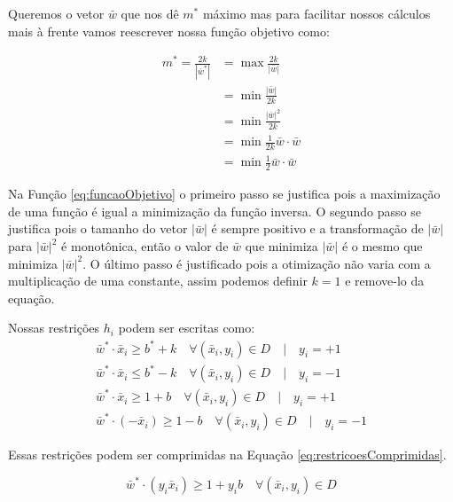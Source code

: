 Queremos o vetor $\bar{w}$ que nos dê $m^*$ máximo mas para facilitar nossos cálculos mais à frente vamos reescrever nossa função objetivo como:

\begin{equation}\label{eq:funcaoObjetivo}
\begin{split}
m^*=\frac{2k}{|\bar{w}^*|} &= \max \frac{2k}{|\bar{w}|} \\
    &= \min \frac{|\bar{w}|}{2k} \\
    &= \min \frac{|\bar{w}|^2}{2k}  \\
    &= \min \frac{1}{2k} \bar{w}\cdot\bar{w}  \\
    &= \min \frac{1}{2} \bar{w}\cdot\bar{w}
\end{split}
\end{equation}

Na Função \ref{eq:funcaoObjetivo} o primeiro passo se justifica pois a maximização de uma função é igual a minimização da função inversa. O segundo passo se justifica pois o tamanho do vetor $|\bar{w}|$ é sempre positivo e a transformação de $|\bar{w}|$ para $|\bar{w}|^2$ é monotônica, então o valor de $\bar{w}$ que minimiza $|\bar{w}|$ é o mesmo que minimiza $|\bar{w}|^2$. O último passo é justificado pois a otimização não varia com a multiplicação de uma constante, assim podemos definir $k=1$ e remove-lo da equação.

Nossas restrições $h_i$ podem ser escritas como:
\begin{equation}
\begin{split}
\bar{w}^*\cdot\bar{x}_i \ge b^*+k \quad \forall (\bar{x}_i,y_i)\in D \quad | \quad y_i=+1 \\
\bar{w}^*\cdot\bar{x}_i \le b^*-k \quad \forall (\bar{x}_i,y_i)\in D \quad | \quad y_i=-1 \\
\bar{w}^*\cdot\bar{x}_i \ge 1+b \quad \forall (\bar{x}_i,y_i)\in D \quad | \quad y_i=+1 \\
\bar{w}^*\cdot(-\bar{x}_i) \ge 1-b \quad \forall (\bar{x}_i,y_i)\in D \quad | \quad y_i=-1
\end{split}
\end{equation}

Essas restrições podem ser comprimidas na Equação \ref{eq:restricoesComprimidas}.

\begin{equation} \label{eq:restricoesComprimidas}
    \bar{w}^*\cdot(y_i\bar{x}_i) \ge 1+y_i b \quad \forall (\bar{x}_i,y_i)\in D
\end{equation}


